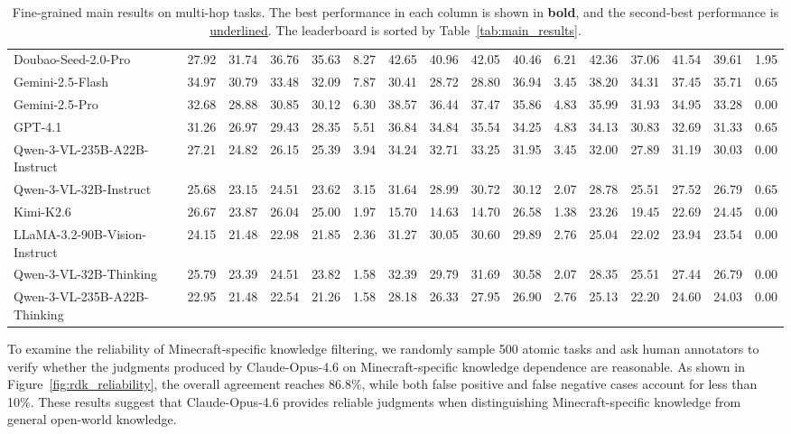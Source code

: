 \documentclass[11pt]{article}
\begin{document}
\begin{table}[t!]
{\begin{tabular}{l|ccccc|ccccc|ccccc}
Doubao-Seed-2.0-Pro & 27.92 & 31.74 & 36.76 & 35.63 & 8.27 & 42.65 & 40.96 & 42.05 & 40.46 & 6.21 & 42.36 & 37.06 & 41.54 & 39.61 & 1.95 \\
Gemini-2.5-Flash & 34.97 & 30.79 & 33.48 & 32.09 & 7.87 & 30.41 & 28.72 & 28.80 & 36.94 & 3.45 & 38.20 & 34.31 & 37.45 & 35.71 & 0.65 \\
Gemini-2.5-Pro & 32.68 & 28.88 & 30.85 & 30.12 & 6.30 & 38.57 & 36.44 & 37.47 & 35.86 & 4.83 & 35.99 & 31.93 & 34.95 & 33.28 & 0.00 \\
GPT-4.1 & 31.26 & 26.97 & 29.43 & 28.35 & 5.51 & 36.84 & 34.84 & 35.54 & 34.25 & 4.83 & 34.13 & 30.83 & 32.69 & 31.33 & 0.65 \\
Qwen-3-VL-235B-A22B-Instruct & 27.21 & 24.82 & 26.15 & 25.39 & 3.94 & 34.24 & 32.71 & 33.25 & 31.95 & 3.45 & 32.00 & 27.89 & 31.19 & 30.03 & 0.00 \\
Qwen-3-VL-32B-Instruct & 25.68 & 23.15 & 24.51 & 23.62 & 3.15 & 31.64 & 28.99 & 30.72 & 30.12 & 2.07 & 28.78 & 25.51 & 27.52 & 26.79 & 0.65 \\
Kimi-K2.6 & 26.67 & 23.87 & 26.04 & 25.00 & 1.97 & 15.70 & 14.63 & 14.70 & 26.58 & 1.38 & 23.26 & 19.45 & 22.69 & 24.45 & 0.00 \\
LLaMA-3.2-90B-Vision-Instruct & 24.15 & 21.48 & 22.98 & 21.85 & 2.36 & 31.27 & 30.05 & 30.60 & 29.89 & 2.76 & 25.04 & 22.02 & 23.94 & 23.54 & 0.00 \\
Qwen-3-VL-32B-Thinking & 25.79 & 23.39 & 24.51 & 23.82 & 1.58 & 32.39 & 29.79 & 31.69 & 30.58 & 2.07 & 28.35 & 25.51 & 27.44 & 26.79 & 0.00 \\
Qwen-3-VL-235B-A22B-Thinking & 22.95 & 21.48 & 22.54 & 21.26 & 1.58 & 28.18 & 26.33 & 27.95 & 26.90 & 2.76 & 25.13 & 22.20 & 24.60 & 24.03 & 0.00 \\
\bottomrule
\end{tabular}}
\caption{Fine-grained main results on multi-hop tasks. The best performance in each column is shown in \textbf{bold}, and the second-best performance is \underline{underlined}. 
The leaderboard is sorted by Table~\ref{tab:main_results}.}
\label{tab:main_results_2}
\end{table}

To examine the reliability of Minecraft-specific knowledge filtering, we randomly sample 500 atomic tasks and ask human annotators to verify whether the judgments produced by Claude-Opus-4.6 on Minecraft-specific knowledge dependence are reasonable. 
As shown in Figure~\ref{fig:rdk_reliability}, the overall agreement reaches 86.8\%, while both false positive and false negative cases account for less than 10\%. 
These results suggest that Claude-Opus-4.6 provides reliable judgments when distinguishing Minecraft-specific knowledge from general open-world knowledge.
\end{document}
